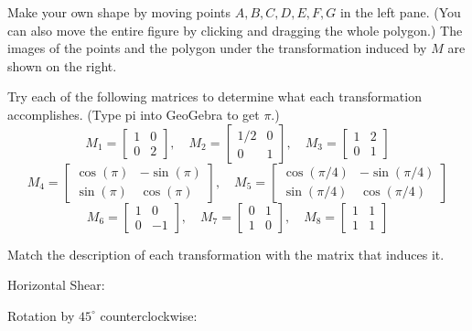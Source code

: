 \documentclass{ximera}
\begin{document}
\begin{exploration}\label{exp:shapeTransformation}
Make your own shape by moving points $A, B, C, D, E, F, G$ in the left pane.  (You can also move the entire figure by clicking and dragging the whole polygon.)  The images of the points and the polygon under the transformation induced by $M$ are shown on the right.

\begin{center}
\end{center}

Try each of the following matrices to determine what each transformation accomplishes.  (Type pi into GeoGebra to get $\pi$.)
$$M_1=\begin{bmatrix}1&0\\0&2\end{bmatrix},\quad M_2=\begin{bmatrix}1/2&0\\0&1\end{bmatrix},\quad M_3=\begin{bmatrix}1&2\\0&1\end{bmatrix}$$
$$M_4=\begin{bmatrix}\cos(\pi)&-\sin(\pi)\\\sin(\pi)&\cos(\pi)\end{bmatrix},\quad M_5=\begin{bmatrix}\cos\left(\pi/4\right)&-\sin\left(\pi/4\right)\\\sin\left(\pi/4\right)&\cos\left(\pi/4\right)\end{bmatrix}$$
$$M_6=\begin{bmatrix}1&0\\0&-1\end{bmatrix},\quad M_7=\begin{bmatrix}0&1\\1&0\end{bmatrix},\quad M_8=\begin{bmatrix}1&1\\1&1\end{bmatrix}$$

Match the description of each transformation with the matrix that induces it.

Horizontal Shear: 

Rotation by $45^{\circ}$ counterclockwise: 


\end{exploration}
\end{document}
